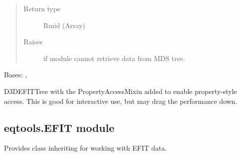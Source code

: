 \documentclass[letterpaper,10pt,english]{sphinxmanual}
\begin{document}
\begin{fulllineitems}
\begin{fulllineitems}
\begin{quote}
\begin{description}
\item[{Return type}] \leavevmode
Rmid (Array)

\item[{Raises}] \leavevmode
{} \textendash{} if module cannot retrieve data from MDS tree.

\end{description}\end{quote}

\end{fulllineitems}


\end{fulllineitems}


\begin{fulllineitems}
\label{\detokenize{eqtools:eqtools.D3DEFIT.D3DEFITTreeProp}}
Bases: {\hyperref[\detokenize{eqtools:eqtools.D3DEFIT.D3DEFITTree}]{}}, {\hyperref[\detokenize{eqtools:eqtools.core.PropertyAccessMixin}]{}}

D3DEFITTree with the PropertyAccessMixin added to enable property-style
access. This is good for interactive use, but may drag the performance down.

\end{fulllineitems}



\subsection{eqtools.EFIT module}
\label{\detokenize{eqtools:module-eqtools.EFIT}}\label{\detokenize{eqtools:eqtools-efit-module}}
Provides class inheriting {\hyperref[\detokenize{eqtools:eqtools.core.Equilibrium}]{}} for working
with EFIT data.
\end{document}
